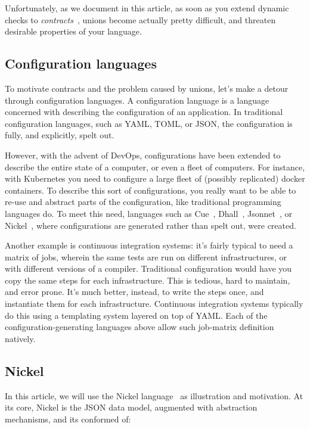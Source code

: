 \documentclass[sigplan,10pt]{acmart}
\begin{document}
Unfortunately, as we document in this article, as soon as you extend
dynamic checks to \emph{contracts}~\cite{FindlerFelleisenHOContracts},
unions become actually pretty difficult, and threaten desirable
properties of your language.

\subsection{Configuration languages}

To motivate contracts and the problem caused by unions, let's make a
detour through configuration languages.
%
A configuration language is a language concerned with describing the
configuration of an application. In traditional configuration
languages, such as YAML, TOML, or JSON, the configuration is fully,
and explicitly, spelt out.

However, with the advent of DevOps, configurations have been extended
to describe the entire state of a computer, or even a fleet of
computers. For instance, with Kubernetes you need to configure a large
fleet of (possibly replicated) docker containers. To describe this
sort of configurations, you really want to be able to re-use and
abstract parts of the configuration, like traditional programming
languages do. To meet this need, languages such as Cue~\cite{cueLang},
Dhall~\cite{dhallLang}, Jsonnet~\cite{jsonnetLang}, or Nickel~\cite{NickelRepo}, where
configurations are generated rather than spelt out, were created.

Another example is continuous integration systems: it's fairly typical
to need a matrix of jobs, wherein the same tests are run on different
infrastructures, or with different versions of a compiler. Traditional
configuration would have you copy the same steps for each
infrastructure. This is tedious, hard to maintain, and error
prone. It's much better, instead, to write the steps once, and
instantiate them for each infrastructure. Continuous integration
systems typically do this using a templating system layered on top of
YAML. Each of the configuration-generating languages above allow such
job-matrix definition natively.

\subsection{Nickel}

In this article, we will use the Nickel language~\cite{NickelRepo} as
illustration and motivation. At its core, Nickel is the JSON data
model, augmented with abstraction mechanisms, and its conformed of:
\end{document}
